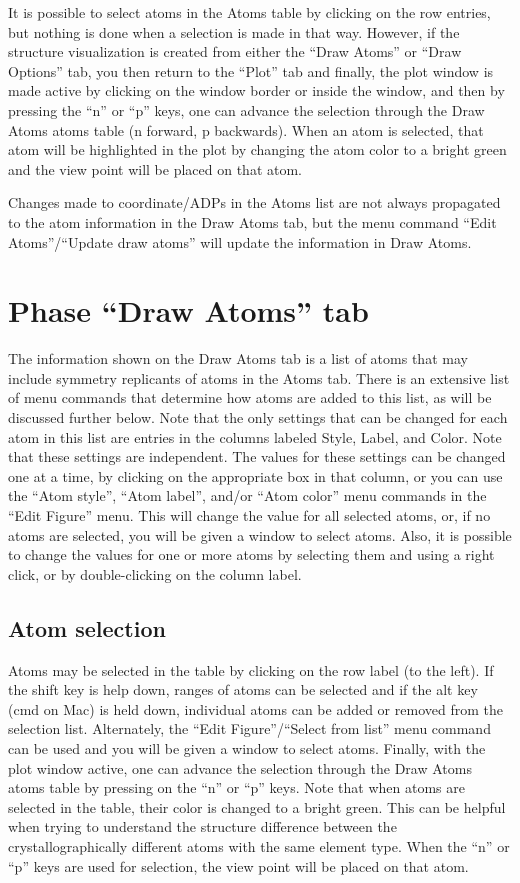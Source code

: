 It is possible to select atoms in the Atoms table by clicking on the row entries, but nothing is done when a  selection is made in that way. However, if  the structure visualization is created from either the ``Draw Atoms'' or ``Draw Options'' tab, you then return to the ``Plot'' tab and finally, the plot window is made active by clicking on the window border or inside the window, and then by pressing the  ``n'' or ``p'' keys, one can advance the selection through the Draw Atoms atoms table (n forward, p backwards). When an atom is selected, that atom will be highlighted in the plot by changing the atom color to a bright green and the view point will be placed on that atom. 

Changes made to coordinate/ADPs in the Atoms list are not always propagated to the atom information in the  Draw Atoms tab, but the menu command ``Edit Atoms''/``Update draw atoms'' will update the information in Draw Atoms. 

\section{Phase ``Draw Atoms'' tab}\label{ref:atomchangeselection}
The information shown on the Draw Atoms tab is a list of atoms that may include symmetry replicants of atoms in the Atoms tab. There is an extensive list of menu commands that determine how atoms are added to this list, as will be discussed further below. Note that the only settings that can be changed for each atom in this list are entries in the columns labeled Style, Label, and Color. Note that these settings are independent. The values for these settings can be changed one at a time, by clicking on the appropriate box in that column, or you can use the  ``Atom style'', ``Atom label'', and/or ``Atom color'' menu commands in the ``Edit Figure'' menu. This will change the value for all selected atoms, or, if no atoms are selected, you will be given a window to select atoms. Also, it is possible to change the values for one or more atoms by selecting them and using a right click, or by double-clicking on the column label. 

\subsection{Atom selection}
Atoms may be selected in the table by clicking on the row label (to the left). 
If the shift key is help down, ranges of atoms can be selected and if the alt key (cmd on Mac) is held down, individual atoms can be added or removed from the selection list.  
Alternately, the ``Edit Figure''/``Select from list'' menu command can be used and you will be given a window to select atoms. Finally, with the plot window active, one can advance the selection through the Draw Atoms atoms table by pressing on the ``n'' or ``p'' keys. 
Note that when atoms are selected in the table, their color is changed to a bright green.  This can be helpful when trying to understand the structure difference between the crystallographically different atoms with the same element type. When the ``n'' or ``p'' keys are used for selection, the view point will be placed on that atom. 

